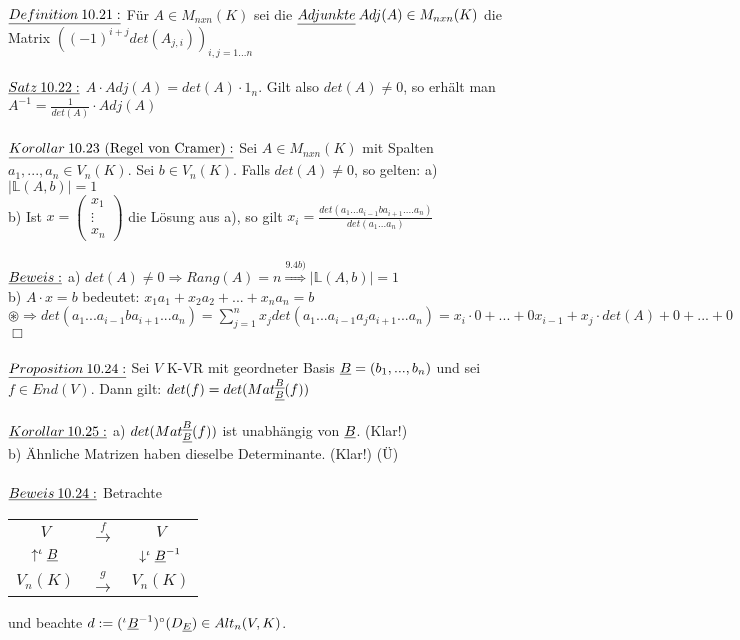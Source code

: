 \documentclass[fleqn, a4paper, 11pt]{article}
\begin{document}
\\
$\uline{Definition\:10.21:}$ F\"ur $A\in M_{nxn}(K)$ sei die $\uline{Adjunkte}\:Adj(A)\in M_{nxn}(K)$ die Matrix $((-1)^{i+j}det(A_{j,i}))_{i,j=1...n}$\\
\\
$\uline{Satz\:10.22:}$ $A\cdot Adj(A)=det(A)\cdot 1_n$. Gilt also $det(A)\neq 0$, so erh\"alt man $A^{-1}=\tfrac{1}{det(A)}\cdot Adj(A)$\\
\\
$\uline{Korollar\:10.23\text{ (Regel von Cramer)}:}$ Sei $A\in M_{nxn}(K)$ mit Spalten $a_1,...,a_n\in V_n(K)$. Sei $b\in V_n(K)$. Falls $det(A)\neq 0$, so gelten: a) $|\mathbb{L}(A,b)|=1$\\
b) Ist $x=\begin{pmatrix}
	x_1\\
	\vdots\\
	x_n
\end{pmatrix}$ die L\"osung aus a), so gilt $x_i=\tfrac{det(a_1...a_{i-1}b a_{i+1}....a_n)}{det(a_1...a_n)}$\\
\\
$\uline{Beweis:}$ a) $det(A)\neq 0\Rightarrow Rang(A)=n\stackrel{9.4b)}{\Rightarrow}|\mathbb{L}(A,b)|=1$\\
b) $A\cdot x=b$ bedeutet: $x_1 a_1+x_2 a_2+...+x_n a_n=b$ $\circledast\Rightarrow det(a_1...a_{i-1} b a_{i+1} ... a_n)=\sum\limits_{j=1}^n x_j det(a_1...a_{i-1} a_j a_{i+1} ... a_n)=x_i\cdot 0+...+0 x_{i-1}+ x_j\cdot det(A)+0+...+0$ \hfill $\Box$\\
\\
$\uline{Proposition\:10.24:}$ Sei $V$ K-VR mit geordneter Basis $\uline{B}=(b_1,...,b_n)$ und sei $f\in End(V)$. Dann gilt: $det(f)=det(Mat_{\uline{B}}^{\uline{B}}(f))$\\
\\
$\uline{Korollar\:10.25:}$ a) $det(Mat_{\uline{B}}^{\uline{B}}(f))$ ist unabh\"angig von $\uline{B}$. (Klar!)\\
b) \"Ahnliche Matrizen haben dieselbe Determinante. (Klar!) (\"U)\\
\\
$\uline{Beweis\:10.24:}$ Betrachte \begin{tabular}{ccc}
	$V$ & $\stackrel{f}{\rightarrow}$ & $V$ \\
	$\uparrow ^{\iota}\uline{B}$ & & $\downarrow ^{\iota}\uline{B}^{-1}$\\
	$V_n(K)$ & $\stackrel{g}{\rightarrow}$ & $V_n(K)$
\end{tabular} und beachte $d:=(^{\iota}\uline{B}^{-1})^{\circ}(D_{\uline{E}})\in Alt_n(V,K)$.\\
\end{document}

